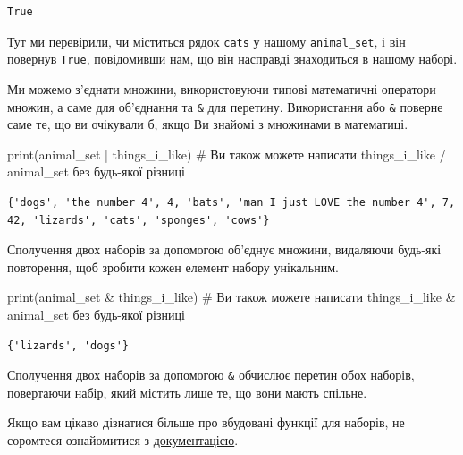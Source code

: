 \documentclass[
  letterpaper,
]{report}
\newenvironment{Shaded}{\begin{snugshade}}{\end{snugshade}}
\newcommand{\BuiltInTok}[1]{\textcolor[rgb]{0.00,0.23,0.31}{#1}}
\newcommand{\CommentTok}[1]{\textcolor[rgb]{0.37,0.37,0.37}{#1}}
\newcommand{\NormalTok}[1]{\textcolor[rgb]{0.00,0.23,0.31}{#1}}
\newcommand{\OperatorTok}[1]{\textcolor[rgb]{0.37,0.37,0.37}{#1}}
\begin{document}
\begin{verbatim}
True
\end{verbatim}

Тут ми перевірили, чи міститься рядок \texttt{cats} у нашому
\texttt{animal\_set}, і він повернув \texttt{True}, повідомивши нам, що
він насправді знаходиться в нашому наборі.

Ми можемо з'єднати множини, використовуючи типові математичні оператори
множин, а саме \texttt{\textbar{}} для об'єднання та \texttt{\&} для
перетину. Використання \texttt{\textbar{}} або \texttt{\&} поверне саме
те, що ви очікували б, якщо Ви знайомі з множинами в математиці.

\begin{Shaded}
\begin{Highlighting}[]
\BuiltInTok{print}\NormalTok{(animal\_set }\OperatorTok{|}\NormalTok{ things\_i\_like) }\CommentTok{\# Ви також можете написати things\_i\_like / animal\_set без будь{-}якої різниці}
\end{Highlighting}
\end{Shaded}

\begin{verbatim}
{'dogs', 'the number 4', 4, 'bats', 'man I just LOVE the number 4', 7, 42, 'lizards', 'cats', 'sponges', 'cows'}
\end{verbatim}

Сполучення двох наборів за допомогою \texttt{\textbar{}} об'єднує
множини, видаляючи будь-які повторення, щоб зробити кожен елемент набору
унікальним.

\begin{Shaded}
\begin{Highlighting}[]
\BuiltInTok{print}\NormalTok{(animal\_set }\OperatorTok{\&}\NormalTok{ things\_i\_like) }\CommentTok{\# Ви також можете написати things\_i\_like \& animal\_set без будь{-}якої різниці}
\end{Highlighting}
\end{Shaded}

\begin{verbatim}
{'lizards', 'dogs'}
\end{verbatim}

Сполучення двох наборів за допомогою \texttt{\&} обчислює перетин обох
наборів, повертаючи набір, який містить лише те, що вони мають спільне.

Якщо вам цікаво дізнатися більше про вбудовані функції для наборів, не
соромтеся ознайомитися з
\href{https://docs.python.org/3/library/stdtypes.html\#set-types-set-frozenset}{документацією}.
\end{document}
